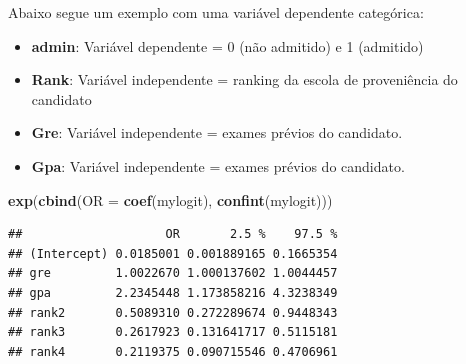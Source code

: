 \documentclass[12pt,brazil,]{book}
\newenvironment{Shaded}{\begin{snugshade}}{\end{snugshade}}
\newcommand{\DataTypeTok}[1]{\textcolor[rgb]{0.13,0.29,0.53}{#1}}
\newcommand{\KeywordTok}[1]{\textcolor[rgb]{0.13,0.29,0.53}{\textbf{#1}}}
\newcommand{\NormalTok}[1]{#1}
\newcommand{\OperatorTok}[1]{\textcolor[rgb]{0.81,0.36,0.00}{\textbf{#1}}}
\newcommand{\StringTok}[1]{\textcolor[rgb]{0.31,0.60,0.02}{#1}}
\providecommand{\tightlist}{%
  \setlength{\itemsep}{0pt}\setlength{\parskip}{0pt}}
\begin{document}
Abaixo segue um exemplo com uma variável dependente categórica:

\begin{itemize}
\tightlist
\item
  \textbf{admin}: Variável dependente = 0 (não admitido) e 1 (admitido)
\item
  \textbf{Rank}: Variável independente = ranking da escola de
  proveniência do candidato
\item
  \textbf{Gre}: Variável independente = exames prévios do candidato.
\item
  \textbf{Gpa}: Variável independente = exames prévios do candidato.
\end{itemize}

\begin{Shaded}
\end{Shaded}

\begin{Shaded}
\begin{Highlighting}[]
\KeywordTok{exp}\NormalTok{(}\KeywordTok{cbind}\NormalTok{(}\DataTypeTok{OR =} \KeywordTok{coef}\NormalTok{(mylogit), }\KeywordTok{confint}\NormalTok{(mylogit)))}
\end{Highlighting}
\end{Shaded}

\begin{verbatim}
##                    OR       2.5 %    97.5 %
## (Intercept) 0.0185001 0.001889165 0.1665354
## gre         1.0022670 1.000137602 1.0044457
## gpa         2.2345448 1.173858216 4.3238349
## rank2       0.5089310 0.272289674 0.9448343
## rank3       0.2617923 0.131641717 0.5115181
## rank4       0.2119375 0.090715546 0.4706961
\end{verbatim}
\end{document}
